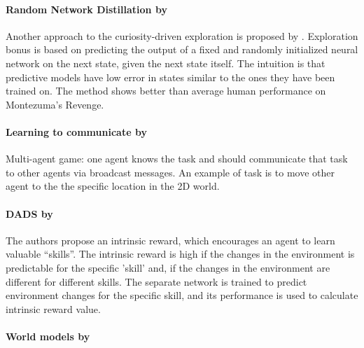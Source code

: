 \documentclass[acmsmall, nonacm]{acmart}
\begin{document}

\paragraph{Random Network Distillation by~\citet{burda_exploration_2019}} %
\label{par:random_distillation}

Another approach to the curiosity-driven exploration is proposed by \citep{burda_exploration_2019}. Exploration bonus is based on predicting the output of a fixed and randomly initialized neural network on the next state, given the next state itself. The intuition is that predictive models have low error in states similar to the ones they have been trained on. The method shows better than average human performance on Montezuma’s Revenge.


\paragraph{Learning to communicate by~\citet{Mordatch2018EmergenceOG}} %
\label{par:learning_tom_communicate}

Multi-agent game: one agent knows the task and should communicate that task to other agents via broadcast messages. An example of task is to move other agent to the the specific location in the 2D world.


\paragraph{DADS by~\citet{Sharma2020DynamicsAwareUD}} %
\label{par:dads}

The authors propose an intrinsic reward, which encourages an agent to learn valuable ``skills''. The intrinsic reward is high if the changes in the environment is predictable for the specific 'skill' and, if the changes in the environment are different for different skills. The separate network is trained to predict environment changes for the specific skill, and its performance is used to calculate intrinsic reward value.


\paragraph{World models by~\citet{ha_recurrent_2018}} %
\label{par:world_models}
\end{document}
